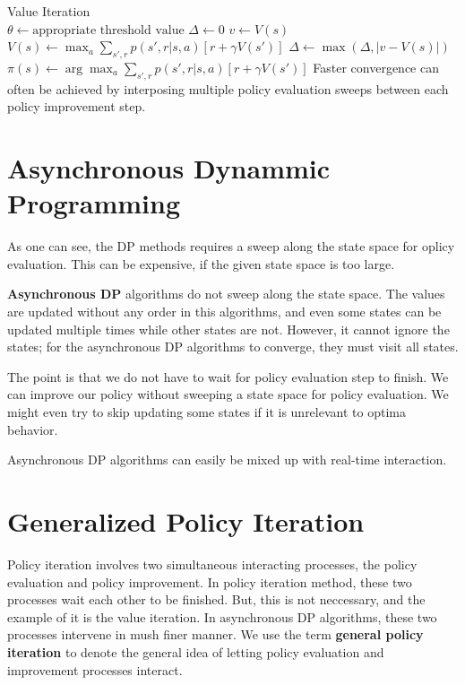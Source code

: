 \documentclass[../../main.tex]{subfiles}
\begin{document}
        {Value Iteration}
        { \\
        }
        {}
        {
            $\theta \leftarrow \text{appropriate threshold value}$\;
            \Repeat{$\Delta < \theta$}
            {
                $\Delta \leftarrow 0$\;
                {
                    $v \leftarrow V(s)$\;
                    $V(s) \leftarrow \max_a \sum_{s',r}p(s',r|s,a)[r + \gamma V(s')]$\;
                    $\Delta \leftarrow \max(\Delta, |v - V(s)|)$\;
                }
            }
            {
                $\pi(s) \leftarrow \arg\max_a \sum_{s',r}p(s',r|s,a)[r + \gamma V(s')]$\;
            }
            \Return{$\pi$}
        }
        Faster convergence can often be achieved by interposing multiple policy evaluation sweeps between each policy improvement step.

\section{Asynchronous Dynammic Programming}
    As one can see, the DP methods requires a sweep along the state space for oplicy evaluation. This can be expensive, if the given state space
    is too large.
    
    \textbf{Asynchronous DP} algorithms do not sweep along the state space. The values are updated without any order in this algorithms, and even some
    states can be updated multiple times while other states are not. However, it cannot ignore the states; for the asynchronous DP algorithms to converge,
    they must visit all states.

    The point is that we do not have to wait for policy evaluation step to finish. We can improve our policy without sweeping a state space for
    policy evaluation. We might even try to skip updating some states if it is unrelevant to optima behavior.

    Asynchronous DP algorithms can easily be mixed up with real-time interaction.

\section{Generalized Policy Iteration}
    Policy iteration involves two simultaneous interacting processes, the policy evaluation and policy improvement. In policy iteration method,
    these two processes wait each other to be finished. But, this is not neccessary, and the example of it is the value iteration.
    In asynchronous DP algorithms, these two processes intervene in mush finer manner. We use the term \textbf{general policy iteration} to denote
    the general idea of letting policy evaluation and improvement processes interact. 
\end{document}
